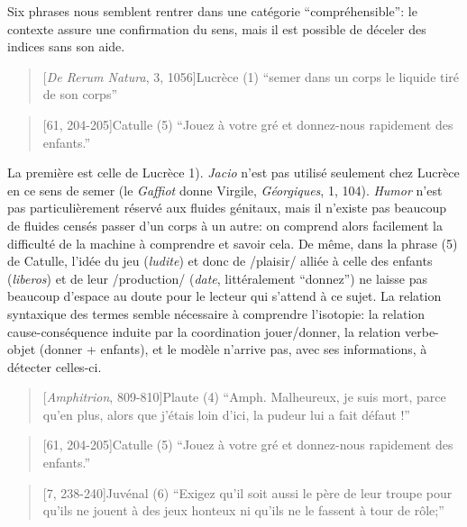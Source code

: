 \starbreak

Six phrases nous semblent rentrer dans une catégorie ``compréhensible'': le contexte assure une confirmation du sens, mais il est possible de déceler des indices sans son aide.

\begin{quote}[\textit{De Rerum Natura}, 3, 1056]{Lucrèce}
    (1) \enquote{semer dans un corps le liquide tiré de son corps}
\end{quote}

\begin{quote}[61, 204-205]{Catulle}
     (5) \enquote{Jouez à votre gré et donnez-nous rapidement des enfants.}
\end{quote}

La première est celle de Lucrèce 1). \textit{Jacio} n'est pas utilisé seulement chez Lucrèce en ce sens de semer (le \textit{Gaffiot} donne Virgile, \textit{Géorgiques}, 1, 104). \textit{Humor} n'est pas particulièrement réservé aux fluides génitaux, mais il n'existe pas beaucoup de fluides censés passer d'un corps à un autre: on comprend alors facilement la difficulté de la machine à comprendre et savoir cela. De même, dans la phrase (5) de Catulle, l'idée du jeu (\textit{ludite}) et donc de /plaisir/ alliée à celle des enfants (\textit{liberos}) et de leur /production/ (\textit{date}, littéralement ``donnez'') ne laisse pas beaucoup d'espace au doute pour le lecteur qui s'attend à ce sujet. La relation syntaxique des termes semble nécessaire à comprendre l'isotopie: la relation cause-conséquence induite par la coordination jouer/donner, la relation verbe-objet (donner + enfants), et le modèle n'arrive pas, avec ses informations, à détecter celles-ci.


\begin{quote}[\textit{Amphitrion}, 809-810]{Plaute}
	(4) ``Amph. Malheureux, je suis mort, parce qu’en plus, alors que j’étais loin d’ici, la pudeur lui a fait défaut !''
\end{quote}

\begin{quote}[61, 204-205]{Catulle}
	(5) ``Jouez à votre gré et donnez-nous rapidement des enfants.''

\end{quote}

\begin{quote}[7, 238-240]{Juvénal}
	(6) ``Exigez qu’il soit aussi le père de leur troupe pour qu’ils ne jouent à des jeux honteux ni qu’ils ne le fassent à tour de rôle;''
\end{quote}

